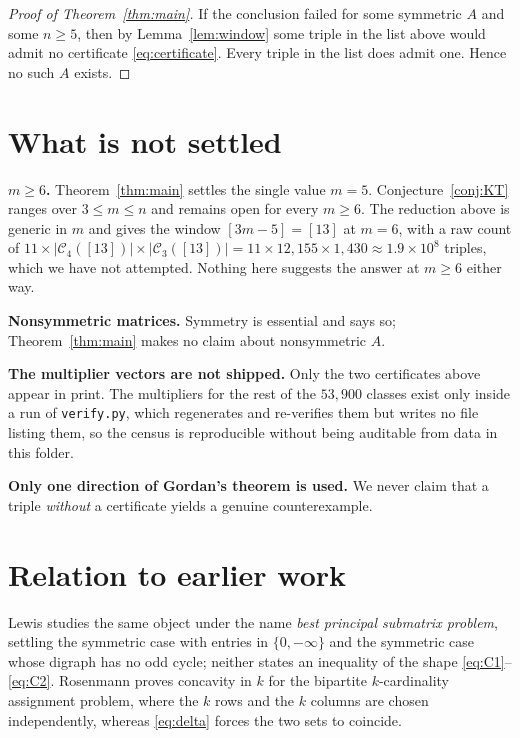 \documentclass[11pt]{amsart}
\newcommand{\Cov}{\mathcal C}
\begin{document}
\begin{proof}[Proof of Theorem~\ref{thm:main}]
If the conclusion failed for some symmetric $A$ and some $n\ge5$, then by
Lemma~\ref{lem:window} some triple in the list above would admit no certificate
\eqref{eq:certificate}. Every triple in the list does admit one. Hence no such
$A$ exists.
\end{proof}

\section{What is not settled}

\noindent\textbf{$m\ge6$.} Theorem~\ref{thm:main} settles the single value
$m=5$. Conjecture~\ref{conj:KT} ranges over $3\le m\le n$ and remains open for
every $m\ge6$. The reduction above is generic in $m$ and gives the window
$[3m-5]=[13]$ at $m=6$, with a raw count of
$11\times|\Cov_4([13])|\times|\Cov_3([13])|=11\times12{,}155\times1{,}430
\approx1.9\times10^8$ triples, which we have not attempted. Nothing here
suggests the answer at $m\ge6$ either way.

\medskip
\noindent\textbf{Nonsymmetric matrices.} Symmetry is essential and \cite{KT}
says so; Theorem~\ref{thm:main} makes no claim about nonsymmetric $A$.

\medskip
\noindent\textbf{The multiplier vectors are not shipped.}
Only the two certificates above appear in print. The multipliers for the rest of
the $53{,}900$ classes exist only inside a run of \texttt{verify.py}, which
regenerates and re-verifies them but writes no file listing them, so the census
is reproducible without being auditable from data in this folder.

\medskip
\noindent\textbf{Only one direction of Gordan's theorem is used.} We never claim
that a triple \emph{without} a certificate yields a genuine counterexample.

\section{Relation to earlier work}

Lewis \cite{Lewis} studies the same object under the name \emph{best principal
submatrix problem}, settling the symmetric case with entries in
$\{0,-\infty\}$ and the symmetric case whose digraph has no odd cycle; neither
states an inequality of the shape \eqref{eq:C1}--\eqref{eq:C2}. Rosenmann
\cite{Rosenmann} proves concavity in $k$ for the bipartite $k$-cardinality
assignment problem, where the $k$ rows and the $k$ columns are chosen
independently, whereas \eqref{eq:delta} forces the two sets to coincide.
\end{document}
